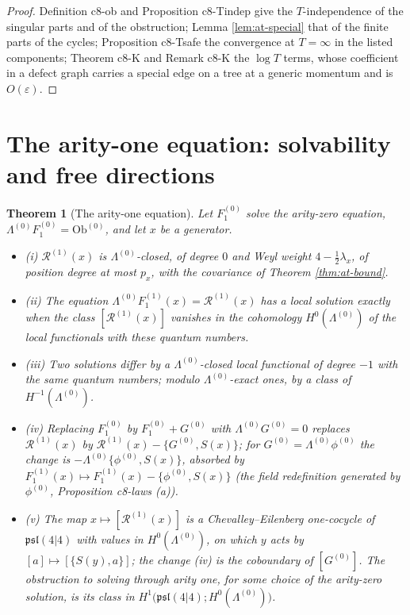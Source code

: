\documentclass[11pt]{article}
\numberwithin{equation}{section}
\theoremstyle{plain}
\newtheorem{theorem}{Theorem}[section]
\theoremstyle{definition}
\newcommand{\Ob}{\mathrm{Ob}}
\begin{document}
\begin{proof}
Definition c8-ob and Proposition c8-Tindep give the $T$-independence of the singular parts and of the obstruction; Lemma \ref{lem:at-special} that of the finite parts of the cycles; Proposition c8-Tsafe the convergence at $T=\infty$ in the listed components; Theorem c8-K and Remark c8-K the $\log T$ terms, whose coefficient in a defect graph carries a special edge on a tree at a generic momentum and is $O(\varepsilon)$.
\end{proof}

\section{The arity-one equation: solvability and free directions}
\label{sec:at-eq1}

\begin{theorem}[The arity-one equation]
\label{thm:at-eq1}
Let $F_1^{(0)}$ solve the arity-zero equation, $\Lambda^{(0)}F_1^{(0)}=\Ob^{(0)}$, and let $x$ be a generator.
\begin{itemize}
\item (i) $\mathcal R^{(1)}(x)$ is $\Lambda^{(0)}$-closed, of degree $0$ and Weyl weight $4-\tfrac12\lambda_x$, of position degree at most $p_x$, with the covariance of Theorem \ref{thm:at-bound}.
\item (ii) The equation $\Lambda^{(0)}F_1^{(1)}(x)=\mathcal R^{(1)}(x)$ has a local solution exactly when the class $[\mathcal R^{(1)}(x)]$ vanishes in the cohomology $H^0(\Lambda^{(0)})$ of the local functionals with these quantum numbers.
\item (iii) Two solutions differ by a $\Lambda^{(0)}$-closed local functional of degree $-1$ with the same quantum numbers; modulo $\Lambda^{(0)}$-exact ones, by a class of $H^{-1}(\Lambda^{(0)})$.
\item (iv) Replacing $F_1^{(0)}$ by $F_1^{(0)}+G^{(0)}$ with $\Lambda^{(0)}G^{(0)}=0$ replaces $\mathcal R^{(1)}(x)$ by $\mathcal R^{(1)}(x)-\{G^{(0)},S(x)\}$; for $G^{(0)}=\Lambda^{(0)}\phi^{(0)}$ the change is $-\Lambda^{(0)}\{\phi^{(0)},S(x)\}$, absorbed by $F_1^{(1)}(x)\mapsto F_1^{(1)}(x)-\{\phi^{(0)},S(x)\}$ (the field redefinition generated by $\phi^{(0)}$, Proposition c8-laws (a)).
\item (v) The map $x\mapsto[\mathcal R^{(1)}(x)]$ is a Chevalley--Eilenberg one-cocycle of $\mathfrak{psl}(4|4)$ with values in $H^0(\Lambda^{(0)})$, on which $y$ acts by $[a]\mapsto[\{S(y),a\}]$; the change (iv) is the coboundary of $[G^{(0)}]$. The obstruction to solving through arity one, for some choice of the arity-zero solution, is its class in $H^1\big(\mathfrak{psl}(4|4);H^0(\Lambda^{(0)})\big)$.
\end{itemize}
\end{theorem}
\end{document}
